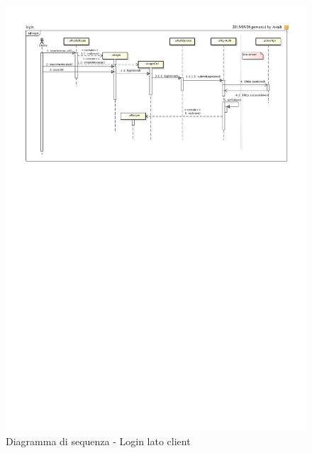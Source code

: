 \begin{figure}[htbp]
	\centering
	\centerline{\includegraphics[scale=1.03]{./images/sequence_diagram/client_login.pdf}}
	\caption{Diagramma di sequenza - Login lato client}
\end{figure}



